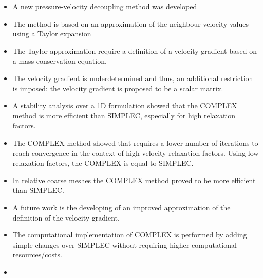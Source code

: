 \documentclass[final,3p,times,10pt,onecolumn]{myElsarticle}
\numberwithin{equation}{section}
\begin{document}
\begin{itemize}
\item A new pressure-velocity decoupling method was developed
\item The method is based on an approximation of the neighbour velocity values using a Taylor expansion
\item The Taylor approximation require a definition of a velocity gradient based on a mass conservation equation.
\item The velocity gradient is underdetermined and thus, an additional restriction is imposed: the velocity gradient is proposed to be a scalar matrix. 
\item A stability analysis over a 1D formulation showed that the COMPLEX method is more efficient than SIMPLEC, especially for high relaxation factors.
\item The COMPLEX method showed that requires a lower number of iterations to reach convergence in the context of high velocity relaxation factors. Using low relaxation factors, the COMPLEX is equal to SIMPLEC.
\item In relative coarse meshes the COMPLEX method proved to be more efficient than SIMPLEC.
\item A future work is the developing of an improved approximation of the definition of the velocity gradient.
\item The computational implementation of COMPLEX is performed by adding simple changes over SIMPLEC without requiring  higher computational resources/costs. 
\item 
\end{itemize}



\end{document}
